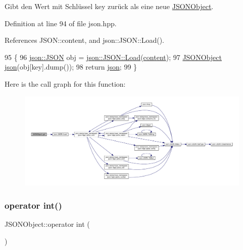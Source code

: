 Gibt den Wert mit Schlüssel {\ttfamily key} zurück als eine neue \mbox{\hyperlink{class_j_s_o_n_object}{J\+S\+O\+N\+Object}}. 

Definition at line 94 of file json.\+hpp.



References J\+S\+O\+N\+::content, and json\+::\+J\+S\+O\+N\+::\+Load().


\begin{DoxyCode}
95 \{
96     \mbox{\hyperlink{classjson_1_1_j_s_o_n}{json::JSON}} obj = \mbox{\hyperlink{classjson_1_1_j_s_o_n_a799ab1cc68cb6e2a41ec948a9a2ecc37}{json::JSON::Load}}(\mbox{\hyperlink{class_j_s_o_n_ad1ace77234b963a2994178ce7f76a181}{content}});
97     \mbox{\hyperlink{class_j_s_o_n_object}{JSONObject}} \mbox{\hyperlink{namespacejson}{json}}(obj[key].dump());
98     \textcolor{keywordflow}{return} \mbox{\hyperlink{namespacejson}{json}};
99 \}
\end{DoxyCode}
Here is the call graph for this function\+:
\nopagebreak
\begin{figure}[H]
\begin{center}
\leavevmode
\includegraphics[width=350pt]{class_j_s_o_n_object_ac2dd3ddb61b11a3ad800b09b41ac1562_cgraph}
\end{center}
\end{figure}
\mbox{\label{class_j_s_o_n_object_a1a866cc075bfb0ca65cb5e93ddb24b0c}} 
\subsubsection{\texorpdfstring{operator int()}{operator int()}}
{\footnotesize\ttfamily J\+S\+O\+N\+Object\+::operator int (\begin{DoxyParamCaption}{ }\end{DoxyParamCaption})\hspace{0.3cm}{\ttfamily [inline]}}

